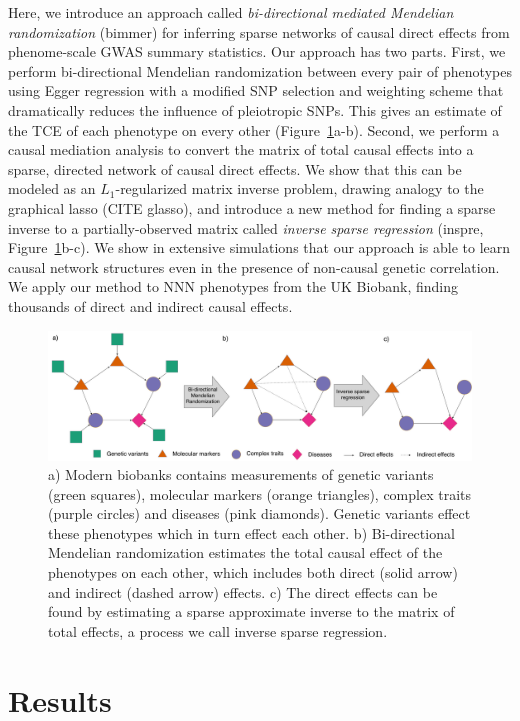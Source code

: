 \documentclass{article}
\begin{document}
Here, we introduce an approach called
\emph{bi-directional mediated Mendelian randomization} (bimmer)
for inferring sparse networks of causal direct effects from phenome-scale
GWAS summary statistics.
Our approach has two parts. First, we perform bi-directional Mendelian randomization
between every pair of phenotypes using Egger regression with a
modified SNP selection and weighting scheme that dramatically reduces the
influence of pleiotropic SNPs.
This gives an estimate of the TCE of each phenotype on every other (Figure~\ref{figure0}a-b).
Second,
we perform a causal mediation analysis to convert the matrix
of total causal effects into a sparse, directed network of causal direct effects.
We show that this can be modeled as an $L_1$-regularized matrix inverse problem,
drawing analogy to the graphical lasso (CITE glasso), and introduce a new
method for finding a sparse inverse to a partially-observed matrix called
\emph{inverse sparse regression} (inspre, Figure~\ref{figure0}b-c).
We show in extensive simulations that our approach is able to learn causal
 network structures even in the presence of non-causal genetic correlation.
We apply our method to NNN phenotypes from the UK Biobank, finding thousands
 of direct and indirect causal effects.
 
 
\begin{figure}\label{figure0}
\includegraphics[width=\textwidth]{figures/bimmer_figure1.pdf}
\caption{a) Modern biobanks contains measurements of genetic variants (green squares), molecular markers
(orange triangles), complex traits (purple circles) and diseases (pink diamonds). Genetic variants
effect these phenotypes which in turn effect each other. b) Bi-directional Mendelian randomization
estimates the total causal effect of the phenotypes on each other, which includes both
direct (solid arrow) and indirect (dashed arrow) effects. c) The direct effects can be
found by estimating a sparse approximate inverse to the matrix of total effects, a process we
call inverse sparse regression.}
\end{figure}

\section{Results}
\end{document}
